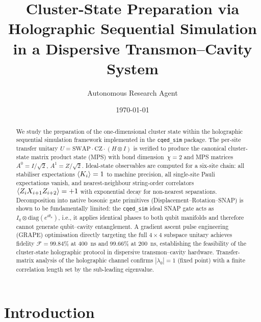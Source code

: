 \documentclass[aps,pra,twocolumn,reprint,floatfix,amsmath,amssymb]{revtex4-2}
\begin{document}
\title{Cluster-State Preparation via Holographic Sequential Simulation\\in a Dispersive Transmon--Cavity System}
\author{Autonomous Research Agent}
\date{\today}

\begin{abstract}
We study the preparation of the one-dimensional cluster state within the
holographic sequential simulation framework implemented in the
\texttt{cqed\_sim} package.  The per-site transfer unitary
$U = \mathrm{SWAP}\cdot\mathrm{CZ}\cdot(H\otimes I)$ is verified to
produce the canonical cluster-state matrix product state (MPS) with
bond dimension~$\chi=2$ and MPS matrices $A^0=I/\sqrt{2}$,
$A^1=Z/\sqrt{2}$.  Ideal-state observables are computed for a
six-site chain: all stabiliser expectations $\braket{K_i}=1$ to
machine precision, all single-site Pauli expectations vanish, and
nearest-neighbour string-order correlators $\braket{Z_iX_{i+1}Z_{i+2}}=+1$
with exponential decay for non-nearest separations.
Decomposition into native bosonic gate primitives
(Displacement--Rotation--SNAP) is shown to be fundamentally limited:
the \texttt{cqed\_sim} ideal SNAP gate acts as
$I_q\otimes\mathrm{diag}(e^{i\theta_n})$, i.e., it applies identical
phases to both qubit manifolds and therefore cannot generate
qubit--cavity entanglement.  A gradient ascent pulse engineering (GRAPE)
optimisation directly targeting the full $4\times4$ subspace unitary
achieves fidelity $\mathcal{F}=99.84\%$ at \SI{400}{ns} and
$99.66\%$ at \SI{200}{ns}, establishing the feasibility of the
cluster-state holographic protocol in dispersive transmon--cavity hardware.
Transfer-matrix analysis of the holographic channel confirms
$|\lambda_0|=1$ (fixed point) with a finite correlation length set by
the sub-leading eigenvalue.
\end{abstract}

\maketitle

\section{Introduction}
\end{document}
